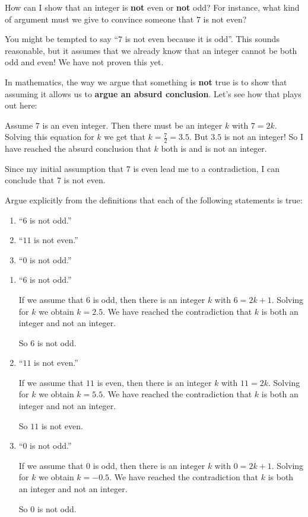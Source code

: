 How can I show that an integer is \textbf{not} even or \textbf{not} odd? For instance, what kind of argument must we give to convince someone that $7$ is not even?

You might be tempted to say ``$7$ is not even because it is odd''.  This sounds reasonable, but it assumes that we already know that an integer cannot be both odd and even!  We have not proven this yet.

In mathematics, the way we argue that something is \textbf{not} true is to show that assuming it allows us to \textbf{argue an absurd conclusion}.  Let's see how that plays out here:

Assume $7$ is an even integer.
Then there must be an integer $k$ with $7 = 2k$.
Solving this equation for $k$ we get that $k = \frac{7}{2} = 3.5$.
But $3.5$ is not an integer!
So I have reached the absurd conclusion that $k$ both is and is not an integer.

Since my initial assumption that $7$ is even lead me to a contradiction, I can conclude that $7$ is not even.

\begin{xca}
	Argue explicitly from the definitions that each of the following statements is true:
	
	\begin{enumerate}
		\item ``$6$ is not odd.''
		\item ``$11$ is not even.''
		\item ``$0$ is not odd.''
	\end{enumerate}
\end{xca}

\begin{solutions}
	
	\begin{enumerate}
		\item ``$6$ is not odd.''
		
		If we assume that $6$ is odd, then there is an integer $k$ with $6=2k+1$.  Solving for $k$ we obtain $k=2.5$.  We have reached the contradiction that $k$ is both an integer and not an integer. 
		
		So $6$ is not odd.
		
		\item ``$11$ is not even.''
		
		If we assume that $11$ is  even, then there is an integer $k$ with $11=2k$.  Solving for $k$ we obtain $k=5.5$.  We have reached the contradiction that $k$ is both an integer and not an integer. 
		
		So $11$ is not even.
		\item ``$0$ is not odd.''
		
		If we assume that $0$ is odd, then there is an integer $k$ with $0=2k+1$.  Solving for $k$ we obtain $k=-0.5$.  We have reached the contradiction that $k$ is both an integer and not an integer. 
		
		So $0$ is not odd.
	\end{enumerate}
\end{solutions}

